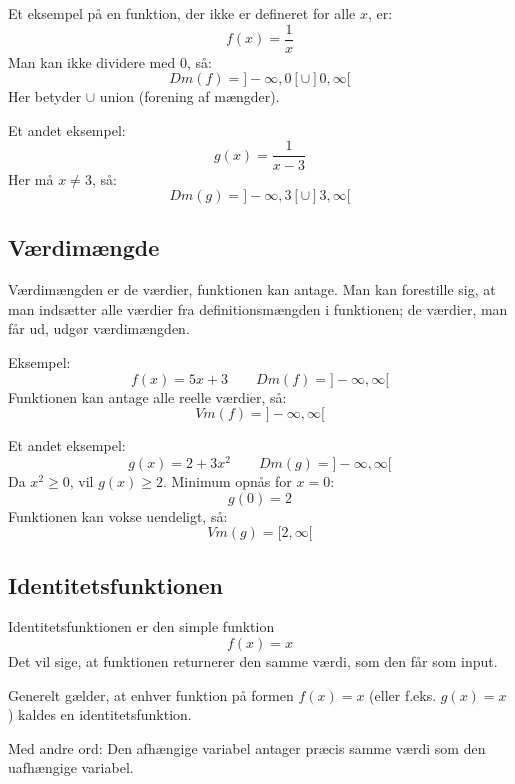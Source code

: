 Et eksempel på en funktion, der ikke er defineret for alle $x$, er:
\begin{equation*}
    f(x) = \frac{1}{x}
\end{equation*}
Man kan ikke dividere med 0, så:
\begin{equation*}
    Dm(f) = ]-\infty, 0[ \cup ]0, \infty[
\end{equation*}
Her betyder $\cup$ union (forening af mængder).

Et andet eksempel:
\begin{equation*}
    g(x) = \frac{1}{x-3}
\end{equation*}
Her må $x \neq 3$, så:
\begin{equation*}
    Dm(g) = ]-\infty, 3[ \cup ]3, \infty[
\end{equation*}

\subsection{Værdimængde}
Værdimængden er de værdier, funktionen kan antage. Man kan forestille sig, at man indsætter alle værdier fra definitionsmængden i funktionen; de værdier, man får ud, udgør værdimængden.

Eksempel:
\begin{equation*}
    f(x) = 5x + 3 \qquad Dm(f) = ]-\infty, \infty[
\end{equation*}
Funktionen kan antage alle reelle værdier, så:
\begin{equation*}
    Vm(f) = ]-\infty, \infty[
\end{equation*}

Et andet eksempel:
\begin{equation*}
    g(x) = 2 + 3x^2 \qquad Dm(g) = ]-\infty, \infty[
\end{equation*}
Da $x^2 \geq 0$, vil $g(x) \geq 2$. Minimum opnås for $x=0$:
\begin{equation*}
    g(0) = 2
\end{equation*}
Funktionen kan vokse uendeligt, så:
\begin{equation*}
    Vm(g) = [2, \infty[
\end{equation*}

\subsection{Identitetsfunktionen}
Identitetsfunktionen er den simple funktion
\begin{equation*}
    f(x) = x
\end{equation*}
Det vil sige, at funktionen returnerer den samme værdi, som den får som input.

Generelt gælder, at enhver funktion på formen $f(x) = x$ (eller f.eks. $g(x) = x$) kaldes en identitetsfunktion.

Med andre ord: Den afhængige variabel antager præcis samme værdi som den uafhængige variabel.